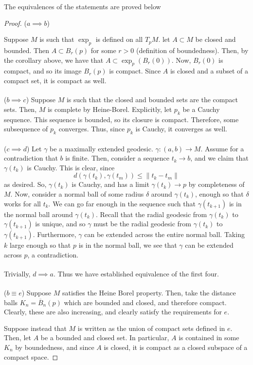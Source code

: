 \documentclass[../main.tex]{subfiles}
\begin{document}
The equivalences of the statements are proved below
\begin{proof}
    ($a\implies b$)

    Suppose $M$ is such that $\exp_p$ is defined on all $T_pM$. let $A\subset M$
    be closed and bounded. Then $A\subset B_r(p)$ for some $r>0$ (definition of
    boundedness). Then, by the corollary above, we have that $A\subset
    \exp_p(B_r(0))$. Now, $B_r(0)$ is compact, and so its image $B_r(p)$ is
    compact. Since $A$ is closed and a subset of a compact set, it is compact as
    well.
    \\
    \\
    ($b\implies c$)
    Suppose $M$ is such that the closed and bounded sets are the compact sets.
    Then, $M$ is complete by Heine-Borel. Explicitly, let $p_k$ be a Cauchy
    sequence. This sequence is bounded, so its closure is compact. Therefore,
    some subsequence of $p_k$ converges. Thus, since $p_k$ is Cauchy, it
    converges as well.
    \\
    \\
    ($c\implies d$)
    Let $\gamma$ be a maximally extended geodesic. $\gamma:(a,b)\to M$. Assume
    for a contradiction that $b$ is finite. Then, consider a sequence $t_k\to
    b$, and we claim that $\gamma(t_k)$ is Cauchy. This is clear, since
    \[
        d(\gamma(t_k),\gamma(t_m)) \leq \|t_k-t_m\|
    \]
    as desired. So, $\gamma(t_k)$ is Cauchy, and has a limit $\gamma(t_k)\to p$
    by completeness of $M$. Now, consider a normal ball of some radius $\delta$
    around $\gamma(t_k)$, enough so that $\delta$ works for all $t_k$. We can go
    far enough in the sequence such that $\gamma(t_{k+1})$ is in the normal ball
    around $\gamma(t_k)$. Recall that the radial geodesic from $\gamma(t_k)$ to
    $\gamma(t_{k+1})$ is unique, and so $\gamma$ must be the radial geodesic
    from $\gamma(t_k)$ to $\gamma(t_{k+1})$. Furthermore, $\gamma$ can be
    extended across the entire normal ball. Taking $k$ large enough so that $p$
    is in the normal ball, we see that $\gamma$ can be extended across $p$, a
    contradiction.
    \\
    \\
    Trivially, $d\implies a$. Thus we have established equivalence of the first
    four.
    \\
    \\
    ($b\equiv e$)
    Suppose $M$ satisfies the Heine Borel property. Then, take the distance
    balls $K_n = \overline{B}_n(p)$ which are bounded and closed, and therefore
    compact. Clearly, these are also increasing, and clearly satisfy the
    requirements for $e$.

    Suppose instead that $M$ is written as the union of compact sets defined in
    $e$. Then, let $A$ be a bounded and closed set. In particular, $A$ is
    contained in some $K_n$ by boundedness, and since $A$ is closed, it is
    compact as a closed subspace of a compact space.
\end{proof}
\end{document}
